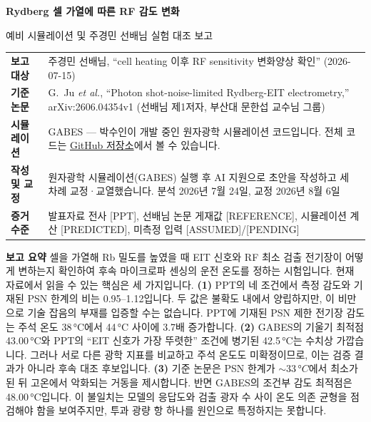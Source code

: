 \documentclass[10pt,a4paper]{article}
\newcommand{\Status}[1]{\textsf{\footnotesize[#1]}}
\newcommand{\summarybox}[1]{%
  \noindent\colorbox{pale}{%
    \parbox{\dimexpr\textwidth-2\fboxsep\relax}{#1}}}
\providecommand{\SlopeOptimumTemperatureC}{43.00}
\providecommand{\SensitivityOptimumTemperatureC}{48.00}
\providecommand{\PaperPSNOptimumC}{33}
\begin{document}
{\color{navy}\LARGE\bfseries Rydberg 셀 가열에 따른 RF 감도 변화\par}
\vspace{2pt}
{\large 예비 시뮬레이션 및 주경민 선배님 실험 대조 보고}

\vspace{0.5em}
\begin{tabularx}{\textwidth}{>{\bfseries}p{2.7cm}X}
보고 대상 & 주경민 선배님, ``cell heating 이후 RF sensitivity 변화양상 확인'' (2026-07-15)\\
기준 논문 & G.\ Ju \textit{et al.}, ``Photon shot-noise-limited Rydberg-EIT electrometry,''
           arXiv:2606.04354v1 (선배님 제1저자, 부산대 문한섭 교수님 그룹)\\
시뮬레이션 & GABES --- 박수인이 개발 중인 원자광학 시뮬레이션 코드입니다.
             전체 코드는 \href{https://github.com/Shake2313/fwm-squeezing-app.git}{GitHub 저장소}에서 볼 수 있습니다.\\
작성 및 교정 & 원자광학 시뮬레이션(GABES) 실행 후 AI 지원으로 초안을 작성하고 세 차례 교정·교열했습니다.
             분석 2026년 7월 24일, 교정 2026년 8월 6일\\
증거 수준 & 발표자료 전사 \Status{PPT}, 선배님 논문 게재값 \Status{REFERENCE},
            시뮬레이션 계산 \Status{PREDICTED},
            미측정 입력 \Status{ASSUMED}/\Status{PENDING}\\
\end{tabularx}

\vspace{0.4em}
\summarybox{%
\textbf{\color{navy}보고 요약}\quad
셀을 가열해 Rb 밀도를 높였을 때 EIT 신호와 RF 최소 검출 전기장이 어떻게 변하는지 확인하여
후속 마이크로파 센싱의 운전 온도를 정하는 시험입니다. 현재 자료에서 읽을 수 있는 핵심은 세 가지입니다.
\textbf{(1)} PPT의 네 조건에서 측정 감도와 기재된 PSN 한계의 비는 0.95--1.12입니다. 두 값은
불확도 내에서 양립하지만, 이 비만으로 기술 잡음의 부재를 입증할 수는 없습니다. PPT에 기재된 PSN 제한
전기장 감도는 주석 온도 38\,°C에서 44\,°C 사이에 3.7배 증가합니다.
\textbf{(2)} GABES의 기울기 최적점 \SlopeOptimumTemperatureC\,°C와 PPT의 ``EIT 신호가 가장 뚜렷한''
조건에 병기된 42.5\,°C는 수치상 가깝습니다. 그러나 서로 다른 광학 지표를 비교하고 주석 온도도
미확정이므로, 이는 검증 결과가 아니라 후속 대조 후보입니다.
\textbf{(3)} 기준 논문은 PSN 한계가 \(\sim\PaperPSNOptimumC\,°C\)에서 최소가 된 뒤 고온에서
악화되는 거동을 제시합니다. 반면 GABES의 조건부 감도 최적점은 \SensitivityOptimumTemperatureC\,°C입니다.
이 불일치는 모델의 응답도와 검출 광자 수 사이 온도 의존 균형을 점검해야 함을 보여주지만,
투과 광량 항 하나를 원인으로 특정하지는 못합니다.}
\end{document}
